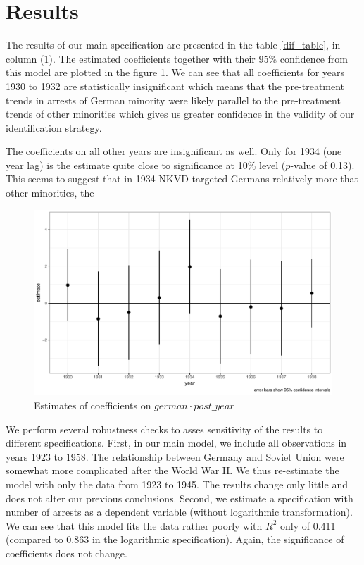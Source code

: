 \documentclass[12pt]{article}
\begin{document}
\section{Results}
The results of our main specification are presented in the table \ref{dif_table}, in column (1). The estimated coefficients together with their 95\% confidence  from this model are plotted in the figure \ref{fig_did_effets}. We can see that all coefficients for years 1930 to 1932 are statistically insignificant which means that the pre-treatment trends in arrests of German minority were likely parallel to the pre-treatment trends of other minorities which gives us greater  confidence in the validity of our identification strategy. 

The coefficients on all other years are insignificant as well. Only for 1934 (one year lag) is the estimate  quite close to significance at 10\% level ($p$-value of 0.13). This seems to suggest that in 1934 NKVD targeted Germans  relatively more that other minorities, the 
\begin{figure}[h]
\centering
\includegraphics[width=\textwidth]{plots/did_effects.pdf}
\caption{Estimates of coefficients on $german \cdot post\_year$}
\label{fig_did_effets}
\end{figure}

We perform several robustness checks to asses sensitivity of the results to different specifications. First, in our main model, we include all observations in years 1923 to 1958. The relationship between Germany and Soviet Union were somewhat more complicated after the World War II. We thus re-estimate the model with only the data from 1923 to 1945. The results change only little and does not alter our previous conclusions. Second, we estimate a specification with number of arrests as a dependent variable (without logarithmic transformation). We can see that this model fits the data rather poorly with  $R^2$ only of 0.411 (compared to 0.863 in the logarithmic specification). Again, the significance of coefficients does not change. 
\end{document}
